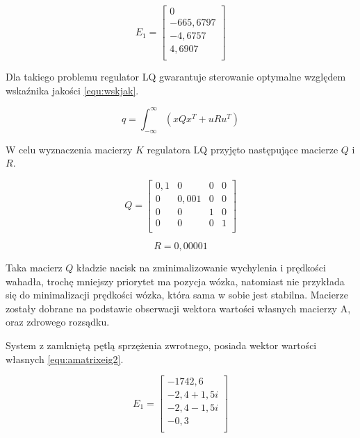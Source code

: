 \documentclass[12pt]{article}
\begin{document}
\begin{equation}
    E_1 = 
    \begin{bmatrix}
              0\\
      -665,6797\\
        -4,6757\\
         4,6907\\
    \end{bmatrix}
    \label{equ:amatrixeig1}
\end{equation}

Dla takiego problemu regulator LQ gwarantuje sterowanie optymalne względem
wskaźnika jakości \eqref{equ:wskjak}.

\begin{equation}
    q = \int_{-\infty}^{\infty}(xQx^T + uRu^T)
    \label{equ:wskjak}
\end{equation}

W celu wyznaczenia macierzy $K$ regulatora LQ przyjęto następujące macierze $Q$
i $R$.

\begin{equation}
    Q = 
    \begin{bmatrix}
        0,1 & 0 & 0 & 0\\
        0 & 0,001 & 0 & 0\\
        0 & 0 & 1 & 0\\
        0 & 0 & 0 & 1\\
    \end{bmatrix}
    \label{equ:lqq}
\end{equation}

\begin{equation}
    R = 0,00001
    \label{equ:lqr}
\end{equation}

Taka macierz $Q$ kładzie nacisk na zminimalizowanie wychylenia i prędkości
wahadła, trochę mniejszy priorytet ma pozycja wózka, natomiast nie przykłada się
do minimalizacji prędkości wózka, która sama w sobie jest stabilna. Macierze
zostały dobrane na podstawie obserwacji wektora wartości własnych macierzy A,
oraz zdrowego rozsądku.

System z zamkniętą pętlą sprzężenia zwrotnego, posiada wektor wartości
własnych \eqref{equ:amatrixeig2}.

\begin{equation}
    E_1 = 
    \begin{bmatrix}
      -1742,6\\
      -2,4 + 1,5i\\
      -2,4 - 1,5i\\
      -0,3\\
    \end{bmatrix}
    \label{equ:amatrixeig2}
\end{equation}
\end{document}
